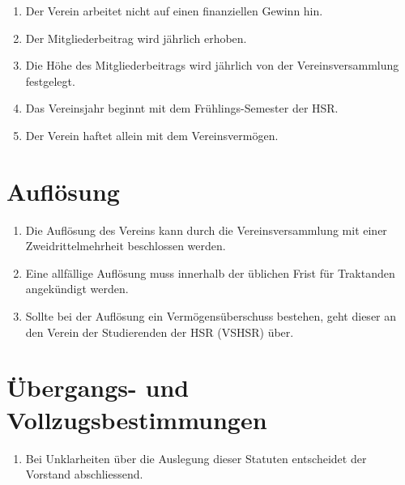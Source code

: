 \documentclass[10pt,a4paper,parskip,fleqn]{scrartcl}
\newcommand{\ol}{\begin{enumerate}[itemsep=-0.2em,topsep=-0.2em]}
\newcommand{\lo}{\end{enumerate}}
\newcommand{\li}{\item}
\begin{document}
\ol
	\li Der Verein arbeitet nicht auf einen finanziellen Gewinn hin.
	\li Der Mitgliederbeitrag wird jährlich erhoben.
	\li Die Höhe des Mitgliederbeitrags wird jährlich von der Vereinsversammlung
	festgelegt.
	\li Das Vereinsjahr beginnt mit dem Frühlings-Semester der HSR.
	\li Der Verein haftet allein mit dem Vereinsvermögen.
\lo


\section{Auflösung}

\ol
	\li Die Auflösung des Vereins kann durch die Vereinsversammlung mit einer
	Zweidrittelmehrheit beschlossen werden.
	\li Eine allfällige Auflösung muss innerhalb der üblichen Frist für Traktanden
	angekündigt werden.
	\li Sollte bei der Auflösung ein Vermögensüberschuss bestehen, geht dieser an
	den Verein der Studierenden der HSR (VSHSR) über.
\lo


\section{Übergangs- und Vollzugsbestimmungen}

\ol
	\li Bei Unklarheiten über die Auslegung dieser Statuten entscheidet der
	Vorstand abschliessend.
\lo
\end{document}
